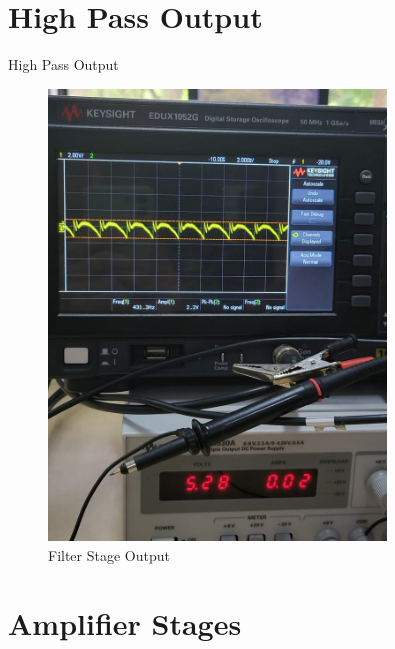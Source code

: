 \documentclass[10pt,xcolor={table,dvipsnames},t]{beamer}
\begin{document}
\section{High Pass Output}
\begin{frame}{High Pass Output}
\begin{figure}
    \centering
    \includegraphics[width=0.8\textwidth]{highpass.jpeg}
    \caption{Filter Stage Output}
\end{figure}
\end{frame}

\section{Amplifier Stages}
\end{document}
